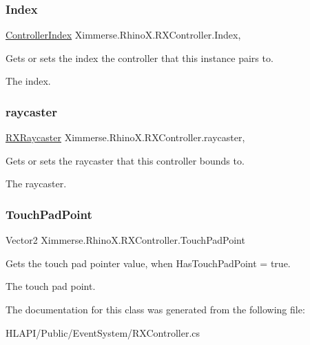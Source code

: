 \subsubsection{\texorpdfstring{Index}{Index}}
{\footnotesize\ttfamily \mbox{\hyperlink{namespace_ximmerse_1_1_rhino_x_a78c4d1657dc299dc9f91fad0ef234666}{Controller\+Index}} Ximmerse.\+Rhino\+X.\+R\+X\+Controller.\+Index\hspace{0.3cm}{\ttfamily [get]}, {\ttfamily [set]}}



Gets or sets the index the controller that this instance pairs to. 

The index.\mbox{\label{class_ximmerse_1_1_rhino_x_1_1_r_x_controller_a777648a528c40d7221682ba898562c95}} 
\subsubsection{\texorpdfstring{raycaster}{raycaster}}
{\footnotesize\ttfamily \mbox{\hyperlink{class_ximmerse_1_1_rhino_x_1_1_r_x_raycaster}{R\+X\+Raycaster}} Ximmerse.\+Rhino\+X.\+R\+X\+Controller.\+raycaster\hspace{0.3cm}{\ttfamily [get]}, {\ttfamily [set]}}



Gets or sets the raycaster that this controller bounds to. 

The raycaster.\mbox{\label{class_ximmerse_1_1_rhino_x_1_1_r_x_controller_ae9a2c7113e7cdc7d802b500d628a2c1c}} 
\subsubsection{\texorpdfstring{Touch\+Pad\+Point}{TouchPadPoint}}
{\footnotesize\ttfamily Vector2 Ximmerse.\+Rhino\+X.\+R\+X\+Controller.\+Touch\+Pad\+Point\hspace{0.3cm}{\ttfamily [get]}}



Gets the touch pad pointer value, when Has\+Touch\+Pad\+Point = true. 

The touch pad point.

The documentation for this class was generated from the following file\+:\begin{DoxyCompactItemize}
\item 
H\+L\+A\+P\+I/\+Public/\+Event\+System/R\+X\+Controller.\+cs\end{DoxyCompactItemize}

